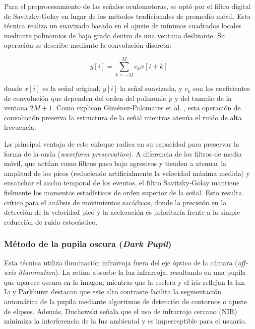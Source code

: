 Para el preprocesamiento de las señales oculomotoras, se optó por el filtro digital de Savitzky-Golay \cite{savitzky1964smoothing} en lugar de los métodos tradicionales de promedio móvil. Esta técnica realiza un suavizado basado en el ajuste de mínimos cuadrados locales mediante polinomios de bajo grado dentro de una ventana deslizante. Su operación se describe mediante la convolución discreta:

\begin{equation}
	y[i] = \sum_{k=-M}^{M} c_k x[i+k] \tag{3}
\end{equation}

donde $x[i]$ es la señal original, $y[i]$ la señal suavizada, y $c_k$ son los coeficientes de convolución que dependen del orden del polinomio $p$ y del tamaño de la ventana $2M+1$. Como explican Giménez-Palomares et al. \cite{gimenez2016aplicacion}, esta operación de convolución preserva la estructura de la señal mientras atenúa el ruido de alta frecuencia.

La principal ventaja de este enfoque radica en su capacidad para preservar la forma de la onda (\textit{waveform preservation}). A diferencia de los filtros de media móvil, que actúan como filtros paso bajo agresivos y tienden a atenuar la amplitud de los picos (reduciendo artificialmente la velocidad máxima medida) y ensanchar el ancho temporal de los eventos, el filtro Savitzky-Golay mantiene fielmente los momentos estadísticos de orden superior de la señal. Esto resulta crítico para el análisis de movimientos sacádicos, donde la precisión en la detección de la velocidad pico y la aceleración es prioritaria frente a la simple reducción de ruido estocástico.

\subsubsection{Método de la pupila oscura (\textit{Dark Pupil})}

Esta técnica utiliza iluminación infrarroja fuera del eje óptico de la cámara (\textit{off-axis illumination}). La retina absorbe la luz infrarroja, resultando en una pupila que aparece oscura en la imagen, mientras que la esclera y el iris reflejan la luz. Li y Parkhurst \cite{li2005starburst} destacan que este alto contraste facilita la segmentación automática de la pupila mediante algoritmos de detección de contornos o ajuste de elipses. Además, Duchowski \cite{duchowski2017} señala que el uso de infrarrojo cercano (NIR) minimiza la interferencia de la luz ambiental y es imperceptible para el usuario.

